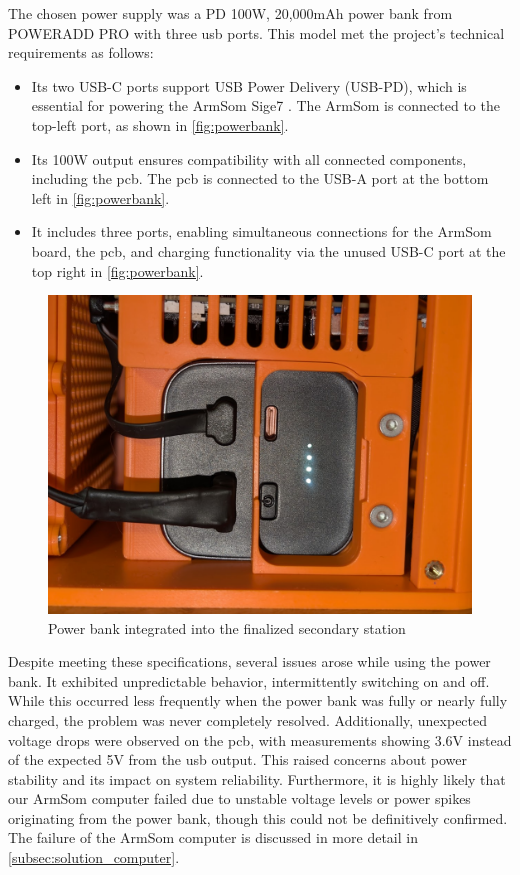 The chosen power supply was a PD 100W, 20,000mAh power bank from POWERADD PRO \cite{poweradd_pro_powerbank} with three \acrfull{usb} ports. This model met the project's technical requirements as follows:
\begin{itemize}
	\item Its two USB-C ports support USB Power Delivery (USB-PD), which is essential for powering the ArmSom Sige7 \cite{armsom_sige7}. The ArmSom is connected to the top-left port, as shown in \autoref{fig:powerbank}.
	\item Its 100W output ensures compatibility with all connected components, including the \acrshort{pcb}. The \acrshort{pcb} is connected to the USB-A port at the bottom left in \autoref{fig:powerbank}.
	\item It includes three ports, enabling simultaneous connections for the ArmSom board, the \acrshort{pcb}, and charging functionality via the unused USB-C port at the top right in \autoref{fig:powerbank}.
\end{itemize}

\begin{figure}[H]
	\centering
	\includegraphics[width=1.0\linewidth]{figures/powerbank}
	\caption{Power bank integrated into the finalized secondary station}
	\label{fig:powerbank}
\end{figure}

Despite meeting these specifications, several issues arose while using the power bank. It exhibited unpredictable behavior, intermittently switching on and off. While this occurred less frequently when the power bank was fully or nearly fully charged, the problem was never completely resolved. Additionally, unexpected voltage drops were observed on the \acrshort{pcb}, with measurements showing 3.6V instead of the expected 5V from the \acrshort{usb} output. This raised concerns about power stability and its impact on system reliability. Furthermore, it is highly likely that our ArmSom computer failed due to unstable voltage levels or power spikes originating from the power bank, though this could not be definitively confirmed. The failure of the ArmSom computer is discussed in more detail in \autoref{subsec:solution_computer}.

